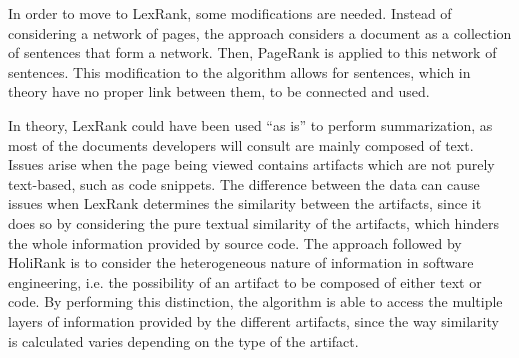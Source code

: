 In order to move to LexRank, some modifications are needed. Instead of considering a network of pages, the approach considers a document as a collection of sentences that form a network. Then, PageRank is applied to this network of sentences. This modification to the algorithm allows for sentences, which in theory have no proper link between them, to be connected and used. 

In theory, LexRank could have been used ``as is'' to perform summarization, as most of the documents developers will consult are mainly composed of text. Issues arise when the page being viewed contains artifacts which are not purely text-based, such as code snippets. The difference between the data can cause issues when LexRank determines the similarity between the artifacts, since it does so by considering the pure textual similarity of the artifacts, which hinders the whole information provided by source code. The approach followed by HoliRank is to consider the heterogeneous nature of information in software engineering, i.e. the possibility of an artifact to be composed of either text or code. By performing this distinction, the algorithm is able to access the multiple layers of information provided by the different artifacts, since the way similarity is calculated varies depending on the type of the artifact. 